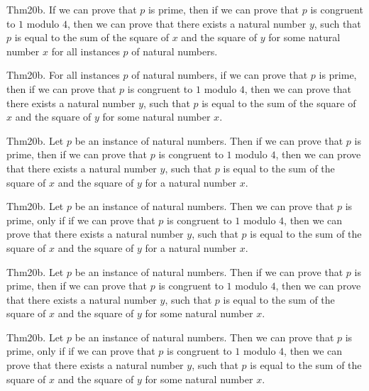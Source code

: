 \documentclass{article}
\begin{document}
Thm20b. If we can prove that $p$ is prime, then if we can prove that $p$ is congruent to $1$ modulo $4$, then we can prove that there exists a natural number $y$, such that $p$ is equal to the sum of the square of $x$ and the square of $y$ for some natural number $x$ for all instances $p$ of natural numbers.

Thm20b. For all instances $p$ of natural numbers, if we can prove that $p$ is prime, then if we can prove that $p$ is congruent to $1$ modulo $4$, then we can prove that there exists a natural number $y$, such that $p$ is equal to the sum of the square of $x$ and the square of $y$ for some natural number $x$.

Thm20b. Let $p$ be an instance of natural numbers. Then if we can prove that $p$ is prime, then if we can prove that $p$ is congruent to $1$ modulo $4$, then we can prove that there exists a natural number $y$, such that $p$ is equal to the sum of the square of $x$ and the square of $y$ for a natural number $x$.

Thm20b. Let $p$ be an instance of natural numbers. Then we can prove that $p$ is prime, only if if we can prove that $p$ is congruent to $1$ modulo $4$, then we can prove that there exists a natural number $y$, such that $p$ is equal to the sum of the square of $x$ and the square of $y$ for a natural number $x$.

Thm20b. Let $p$ be an instance of natural numbers. Then if we can prove that $p$ is prime, then if we can prove that $p$ is congruent to $1$ modulo $4$, then we can prove that there exists a natural number $y$, such that $p$ is equal to the sum of the square of $x$ and the square of $y$ for some natural number $x$.

Thm20b. Let $p$ be an instance of natural numbers. Then we can prove that $p$ is prime, only if if we can prove that $p$ is congruent to $1$ modulo $4$, then we can prove that there exists a natural number $y$, such that $p$ is equal to the sum of the square of $x$ and the square of $y$ for some natural number $x$.
\end{document}
